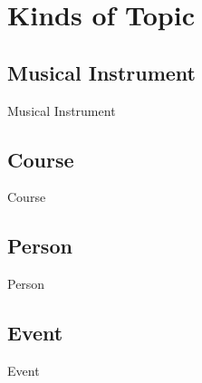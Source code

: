 \documentclass[../../DD.tex]{subfiles}
\begin{document}
\section{Kinds of Topic \label{sect:2.1}}
	\subsection{Musical Instrument}
		Musical Instrument
	\subsection{Course}
		Course
	\subsection{Person}
		Person
	\subsection{Event}
		Event

	
\end{document}
